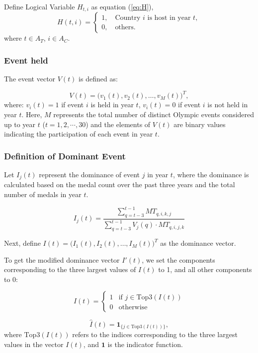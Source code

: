 \documentclass{mcmthesis}
\begin{document}
	Define Logical Variable $H_{t,i}$ as equation (\ref{eq:H}),
	\begin{equation}
		H(t,i)=
		\begin{cases}
			1, \quad \text{Country } i \text{ is host in year } t, \\
			0, \quad \text{others}.
		\end{cases}
		\label{eq:H}
	\end{equation}
	where $t\in A_{T}$, $i\in A_{C}$.
	
	
	
	\subsubsection{Event held}
	The event vector \( V(t) \) is defined as:
	
	\[
	V(t) = \big( v_1(t), v_2(t), \dots, v_M(t) \big)^T,
	\]
	where: \( v_i(t) = 1 \) if event \( i \) is held in year \( t \),
	\( v_i(t) = 0 \) if event \( i \) is not held in year \( t \). Here, \( M \) represents the total number of distinct Olympic events considered up to year \( t \) ($t=1,2,\cdots,30$) and the elements of \( V(t) \) are binary values indicating the participation of each event in year \( t \).
	
	
	
\subsubsection{Definition of Dominant Event}

Let \( I_j(t) \) represent the dominance of event \( j \) in year \( t \), where the dominance is calculated based on the medal count over the past three years and the total number of medals in year \( t \).

\[
I_j(t) = \frac{\sum_{q=t-3}^{t-1} MT_{q,i,k,j}}{\sum_{q=t-3}^{t-1} V_j(q) \cdot MT_{q,i,j,k}} 
\]

Next, define \( I(t) = \big( I_1(t), I_2(t), \dots, I_M(t) \big)^T \) as the dominance vector. 

To get the modified dominance vector \( I'(t) \), we set the components corresponding to the three largest values of \( I(t) \) to 1, and all other components to 0:

\[
\hat{I}(t) = 
\begin{cases} 
	1 & \text{if } j \in \text{Top3}(I(t)) \\
	0 & \text{otherwise}
\end{cases}
\]

\[\hat{I}(t) = \mathbf{1}_{\{ j \in \text{Top3}(I(t)) \}},\]
where \( \text{Top3}(I(t)) \) refers to the indices corresponding to the three largest values in the vector \( I(t) \), and \( \mathbf{1} \) is the indicator function.
\end{document}
